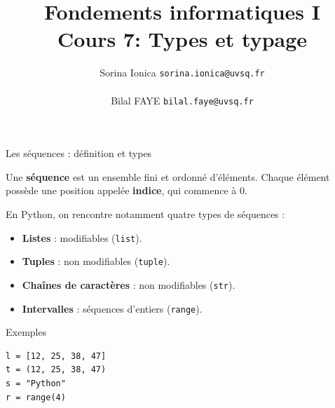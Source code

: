 \documentclass[10pt]{beamer}
\title[IN100 Cours 7]{\textbf{Fondements informatiques I}\\
Cours 7: Types et typage}
\author[]{Sorina Ionica \texttt{sorina.ionica@uvsq.fr} \\~\\Bilal FAYE  \texttt{bilal.faye@uvsq.fr} }
\institute{}
\date{}
\begin{document}
\frame{\titlepage}
\begin{frame}[fragile]{Les séquences : définition et types}

Une \textbf{séquence} est un ensemble fini et ordonné
d'éléments. Chaque élément possède une position appelée
\textbf{indice}, qui commence à 0.

\medskip

\begin{center}
\end{center}

En Python, on rencontre notamment quatre types de séquences :

\begin{itemize}
    \item \textbf{Listes} : modifiables (\texttt{list}).
    \item \textbf{Tuples} : non modifiables (\texttt{tuple}).
    \item \textbf{Chaînes de caractères} : non modifiables (\texttt{str}).
    \item \textbf{Intervalles} : séquences d'entiers (\texttt{range}).
\end{itemize}

\begin{exampleblock}{Exemples}
\begin{lstlisting}
l = [12, 25, 38, 47]
t = (12, 25, 38, 47)
s = "Python"
r = range(4)
\end{lstlisting}
\end{exampleblock}

\end{frame}
\end{document}
